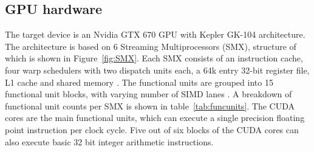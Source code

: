 \documentclass[11pt, oneside, a4paper]{article}
\begin{document}













\subsection{GPU hardware} %
\label{sub:introduction_to_the_gk_104}

The target device is an Nvidia GTX 670 GPU with Kepler GK-104 architecture. The architecture is based on 6 Streaming Multiprocessors (SMX), structure of which is shown in Figure~\ref{fig:SMX}. Each SMX consists of an instruction cache, four warp schedulers with two dispatch units each, a 64k entry 32-bit register file, L1 cache and shared memory \cite{GK-104 Whitepaper}. The functional units are grouped into 15 functional unit blocks, with varying number of SIMD lanes \cite{Anand}. A breakdown of functional unit counts per SMX is shown in table~\ref{tab:funcunits}. The CUDA cores are the main functional units, which can execute a single precision floating point instruction per clock cycle. Five out of six blocks of the CUDA cores can also execute basic 32 bit integer arithmetic instructions.
\end{document}
